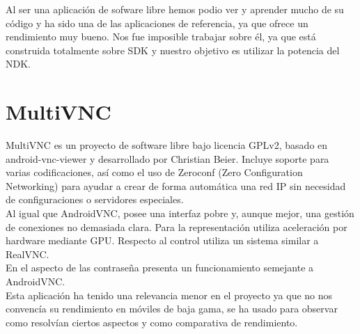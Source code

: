 Al ser una aplicación de sofware libre hemos podio ver y aprender mucho de su código y ha sido una de las aplicaciones de referencia, ya que ofrece un rendimiento muy bueno. Nos fue imposible trabajar sobre él, ya que está construida totalmente sobre SDK y nuestro objetivo es utilizar la potencia del NDK.

\section{MultiVNC}
MultiVNC \cite{multivnc:multivnc} es un proyecto de software libre bajo licencia GPLv2,  basado en android-vnc-viewer y desarrollado por Christian Beier. Incluye soporte para varias codificaciones, así como el uso de Zeroconf (Zero Configuration Networking) para ayudar a crear de forma automática una red IP sin necesidad de configuraciones o servidores especiales.\\

Al igual que AndroidVNC, posee una interfaz pobre y, aunque mejor, una gestión de conexiones no demasiada clara. Para la representación utiliza aceleración por hardware mediante GPU. Respecto al control utiliza un sistema similar a RealVNC.\\

En el aspecto de las contraseña presenta un funcionamiento semejante a AndroidVNC.\\

Esta aplicación ha tenido una relevancia menor en el proyecto ya que no nos convencía su rendimiento en móviles de baja gama, se ha usado para observar como resolvían ciertos aspectos y como comparativa de rendimiento.
